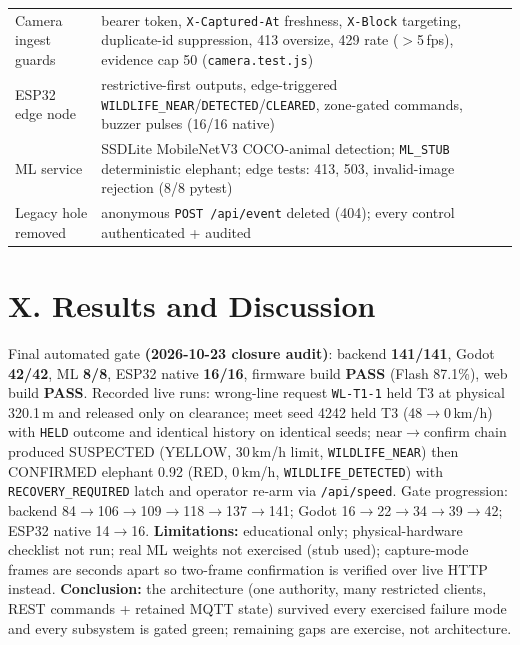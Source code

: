 \documentclass[10pt,a4paper,twocolumn]{article}
\newcommand{\sect}[1]{\section{#1}}
\begin{document}
\begin{table}[H]
\begin{tabularx}{\linewidth}{p{3.35cm} X}
Camera ingest guards & bearer token, \texttt{X-Captured-At} freshness, \texttt{X-Block} targeting, duplicate-id suppression, 413 oversize, 429 rate ($>$5\,fps), evidence cap 50 (\texttt{camera.test.js})\\
ESP32 edge node & restrictive-first outputs, edge-triggered \texttt{WILDLIFE\_NEAR}/\texttt{DETECTED}/\texttt{CLEARED}, zone-gated commands, buzzer pulses (16/16 native)\\
ML service & SSDLite MobileNetV3 COCO-animal detection; \texttt{ML\_STUB} deterministic elephant; edge tests: 413, 503, invalid-image rejection (8/8 pytest)\\
Legacy hole removed & anonymous \texttt{POST /api/event} deleted (404); every control authenticated + audited\\
\bottomrule
\end{tabularx}
\end{table}

\sect{X. Results and Discussion}
Final automated gate \textbf{(2026-10-23 closure audit)}: backend \textbf{141/141}, Godot \textbf{42/42}, ML \textbf{8/8}, ESP32 native \textbf{16/16}, firmware build \textbf{PASS} (Flash 87.1\%), web build \textbf{PASS}. Recorded live runs: wrong-line request \texttt{WL-T1-1} held T3 at physical 320.1\,m and released only on clearance; meet seed 4242 held T3 (48$\rightarrow$0\,km/h) with \texttt{HELD} outcome and identical history on identical seeds; near$\rightarrow$confirm chain produced SUSPECTED (YELLOW, 30\,km/h limit, \texttt{WILDLIFE\_NEAR}) then CONFIRMED elephant 0.92 (RED, 0\,km/h, \texttt{WILDLIFE\_DETECTED}) with \texttt{RECOVERY\_REQUIRED} latch and operator re-arm via \texttt{/api/speed}. Gate progression: backend 84$\rightarrow$106$\rightarrow$109$\rightarrow$118$\rightarrow$137$\rightarrow$141; Godot 16$\rightarrow$22$\rightarrow$34$\rightarrow$39$\rightarrow$42; ESP32 native 14$\rightarrow$16. \textbf{Limitations:} educational only; physical-hardware checklist not run; real ML weights not exercised (stub used); capture-mode frames are seconds apart so two-frame confirmation is verified over live HTTP instead. \textbf{Conclusion:} the architecture (one authority, many restricted clients, REST commands + retained MQTT state) survived every exercised failure mode and every subsystem is gated green; remaining gaps are exercise, not architecture.
\end{document}
